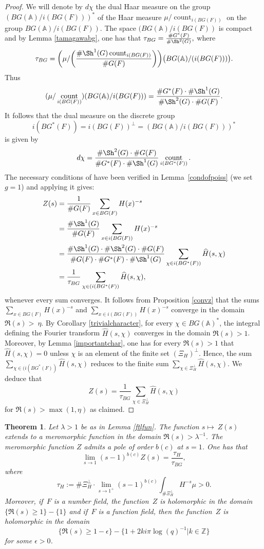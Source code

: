 \documentclass[a4paper,english,12pt]{amsart}
\newcommand{\ZZ}{\mathbb{Z}}
\newcommand{\AAA}{\mathbb A}
\newcommand{\wH}{\widehat H}
\DeclareMathOperator{\coun}{count}
\def\no{n\textsuperscript{0}\,}
\newtheorem{thm}[equation]{Theorem}
\numberwithin{equation}{subsection}
\begin{document}
\begin{proof}
We will denote by $d\chi$ the dual Haar measure on the group $(BG(\AAA)/i(BG(F)))^*$ of the Haar measure $\mu/\coun_{i(BG(F))}$ on the group $BG(\AAA)/i(BG(F)).$ The space $(BG(\AAA)/i(BG(F))$ is compact and by Lemma \ref{tamagawabg}, one has that $\tau_{BG}= \frac{\# G^*(F)}{\# \Sh^2(G)},$ where 
\begin{align*}
\tau_{BG}=\bigg(\mu/\bigg(\frac{\# \Sh^1(G)\coun_{i(BG(F))}}{\# G(F)}\bigg)\bigg)\big(BG(\AAA)/(i(BG(F)))\big).
\end{align*}
Thus $$(\mu/\coun_{i(BG(F))})(BG(\AAA)/i(BG(F)))=\frac{\# G^*(F)\cdot \#\Sh^1(G)}{\# \Sh^2(G)\cdot \# G(F)}.$$
It follows that the dual measure on the discrete group $$i(BG^*(F))=i(BG(F))^{\perp}=(BG(\AAA)/i(BG(F)))^*$$ is given by$$d\chi=\frac{\# \Sh^2(G)\cdot \# G(F)}{\# G^*(F)\cdot \#\Sh^1(G)}\coun_{i(BG^*(F))}.$$
The necessary conditions of \cite[Chapter II, \S1, \no 8, Proposition 8]{TSpectrale} have been verified  in Lemma~\ref{condofpoiss} (we set $g=1$) and applying it gives:
\begin{align*}
Z(s)&=\frac{1}{\# G(F)}\sum_{x\in BG(F)}H(x)^{-s}\\
&=\frac{\#\Sh^1(G)}{\# G(F)}\sum_{x\in i(BG(F))}H(x)^{-s}\\
&=\frac{\# \Sh^1(G)\cdot\# \Sh^2(G)\cdot \# G(F)}{\# G(F)\cdot\# G^*(F)\cdot \# \Sh^1(G)}\sum_{\chi\in i(BG^*(F))}\wH(s,\chi)\\
&=\frac{1}{\tau_{BG}}\sum_{\chi\in (i(BG^*(F))}\wH(s,\chi),
\end{align*}
whenever every sum converges. It follows from Proposition \ref{convz} that the sums $\sum_{x\in BG(F)}H(x)^{-s}$ and $\sum_{x\in i(BG(F))}H(x)^{-s}$ converge in the domain $\Re(s)>~\eta$. By Corollary \ref{trivialcharacter}, for every $\chi\in BG(\AAA)^*$, the integral defining the Fourier transform $\wH(s,\chi)$ converges in the domain $\Re(s)>1$. Moreover, by Lemma \ref{importantchar}, one has for every $\Re(s)>1$ that $\wH(s,\chi)=0$ unless $\chi$ is an element of the finite set $(\Xi_H)^{\perp}.$ Hence, the sum $\sum_{\chi\in (i(BG^*(F))}\wH(s,\chi)$ reduces to the finite sum $\sum_{\chi\in\Xi_H^{\perp}}\wH(s,\chi).$ We deduce that $$Z(s)=\frac{1}{\tau_{BG}}\sum_{\chi\in \Xi_H^\perp}\wH(s,\chi)$$ for $\Re(s)>\max(1,\eta)$ as claimed.
\end{proof}
\begin{thm}\label{residueofz}
Let $\lambda>1$ be as in Lemma \ref{ftlfun}. The function $s\mapsto~Z(s)$ extends to a meromorphic function in the domain $\Re(s)>\lambda^{-1}.$ The meromorphic function $Z$ admits a pole of order $b(c)$ at $s=1$. One has that \begin{equation*}\lim_{s\to 1}(s-1)^{b(c)}Z(s)=\frac{\tau_H }{\tau_{BG}},\end{equation*}
where $$\tau_H:=\#\Xi_H^\perp\cdot\lim_{s\to 1^+}(s-1)^{b(c)}\int_{\#\Xi_H^\perp}H^{-s}\mu>0.$$
Moreover, if~$F$ is a number field, the function~$Z$ is holomorphic in the domain $\{\Re(s)\geq 1\}-\{1\}$ and if~$F$ is a function field, then the function~$Z$ is holomorphic in the domain $$\{\Re(s)\geq 1-\epsilon\}-\{1+2ki\pi\log(q)^{-1}|k\in\ZZ\}$$ for some $\epsilon>0$.
\end{thm}
\end{document}

